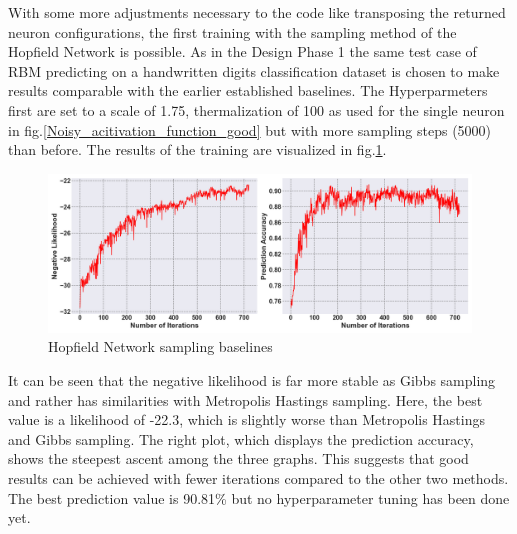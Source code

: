 With some more adjustments necessary to the code like transposing the returned neuron configurations, the first training with the sampling method of the Hopfield Network is possible. 
As in the Design Phase 1 the same test case of \ac{RBM} predicting on a handwritten digits classification dataset is chosen to make results comparable with the earlier established baselines.
The Hyperparmeters first are set to a scale of 1.75, thermalization of 100 as used for the single neuron in fig.\ref{Noisy_acitivation_function_good} but with more sampling steps (5000) than before. 
The results of the training are visualized in fig.\ref{HNN_training}.
\begin{figure}[H]
    \centering
    \includegraphics[width=1\linewidth]{graphics/HNN_combined_plot.png}
    \caption{Hopfield Network sampling baselines}
    \label{HNN_training}
\end{figure}
It can be seen that the negative likelihood is far more stable as Gibbs sampling and rather has similarities with Metropolis Hastings sampling.
Here, the best value is a likelihood of -22.3, which is slightly worse than Metropolis Hastings and Gibbs sampling. 
The right plot, which displays the prediction accuracy, shows the steepest ascent among the three graphs.
This suggests that good results can be achieved with fewer iterations compared to the other two methods.
The best prediction value is 90.81\% but no hyperparameter tuning has been done yet. 


